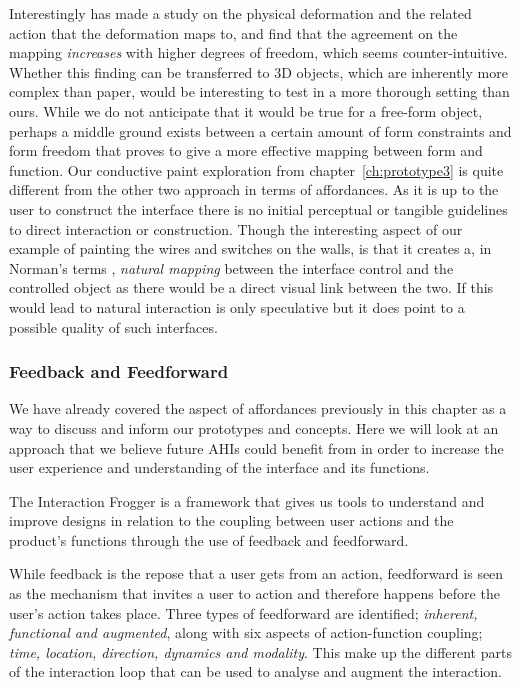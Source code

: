 Interestingly \citet{lee2010users} has made a study on the physical deformation and the related action that the deformation maps to, and find that the agreement on the mapping \emph{increases} with higher degrees of freedom, which seems counter-intuitive.
Whether this finding can be transferred to 3D objects, which are inherently more complex than paper, would be interesting to test in a more thorough setting than ours.
While we do not anticipate that it would be true for a free-form object, perhaps a middle ground exists between a certain amount of form constraints and form freedom that proves to give a more effective mapping between form and function.
\blank
Our conductive paint exploration from chapter~\ref{ch:prototype3} is quite different from the other two approach in terms of affordances.
As it is up to the user to construct the interface there is no initial perceptual or tangible guidelines to direct interaction or construction. Though the interesting aspect of our example of painting the wires and switches on the walls, is that it creates a, in Norman's terms \citep{norman2002design}, \emph{natural mapping} between the interface control and the controlled object as there would be a direct visual link between the two.
If this would lead to natural interaction is only speculative but it does point to a possible quality of such interfaces. 

\subsubsection{Feedback and Feedforward}
We have already covered the aspect of affordances previously in this chapter as a way to discuss and inform our prototypes and concepts.
Here we will look at an approach that we believe future AHIs could benefit from in order to increase the user experience and understanding of the interface and its functions.

The Interaction Frogger is a framework \citep{stienstra2012design,wensveen2004interaction} that gives us tools to understand and improve designs in relation to the coupling between user actions and the product's functions through the use of feedback and feedforward.

While feedback is the repose that a user gets from an action, feedforward is seen as the mechanism that invites a user to action and therefore happens before the user's action takes place. 
Three types of feedforward are identified; \emph{inherent, functional and augmented}, along with six aspects of action-function coupling; \emph{time, location, direction, dynamics and modality}.
This make up the different parts of the interaction loop that can be used to analyse and augment the interaction.

